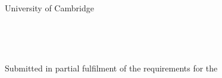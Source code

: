 \begin{titlepage}
  \vspace*{3cm}
  \makeatletter
  \begin{center}
    \begin{Huge}
      \textbf{\textsc{\@title}}
    \end{Huge}\\[0.5cm]
    \begin{Large}
      \emph{\@subtitle}
    \end{Large}\\[4cm]
    \begin{Large}
      \@author        
    \end{Large}\\[1cm]
    \begin{Large}
      University of Cambridge
    \end{Large}\\[0.3cm]
    \begin{Large}
      \college{}   
    \end{Large}\\[3cm]
    \begin{Large}
        \submissionmonthyear{}
    \end{Large}
    \vfill
    Submitted in partial fulfilment of the requirements for the  \\
    \emph{\coursethe}
  \end{center}
  \makeatother
\end{titlepage}

\newpage
